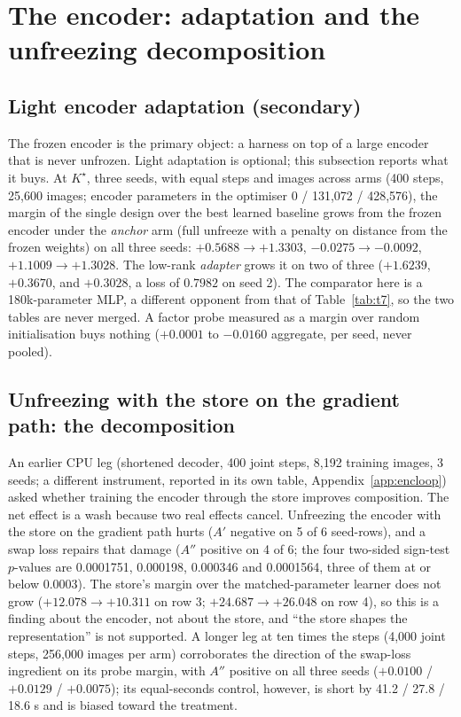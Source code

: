 \documentclass{article} %
\newcommand{\Kstar}{\ensuremath{K^{\star}}}
\begin{document}
\section{The encoder: adaptation and the unfreezing decomposition}
\label{app:encoder-main}

\subsection*{Light encoder adaptation (secondary)}

The frozen encoder is the primary object: a harness on top of a large encoder that is never
unfrozen. Light adaptation is optional; this subsection reports what it buys. At $\Kstar$, three
seeds, with equal steps and images across arms (400 steps, 25,600 images; encoder parameters in the
optimiser 0 / 131,072 / 428,576), the margin of the single design over the best learned
baseline grows from the frozen encoder under the \emph{anchor} arm (full unfreeze with a
penalty on distance from the frozen weights) on all three seeds: $+0.5688\to+1.3303$,
$-0.0275\to-0.0092$, $+1.1009\to+1.3028$. The low-rank \emph{adapter} grows it on two of
three ($+1.6239$, $+0.3670$, and $+0.3028$, a loss of $0.7982$ on seed 2).
The comparator here is a 180k-parameter MLP, a different opponent from that of
Table~\ref{tab:t7}, so the two tables are never merged. A factor probe measured as a margin over
random initialisation buys nothing ($+0.0001$ to $-0.0160$ aggregate, per seed, never pooled).

\subsection*{Unfreezing with the store on the gradient path: the decomposition}

An earlier CPU leg (shortened decoder, 400 joint steps, 8,192 training images, 3 seeds; a
different instrument, reported in its own table, Appendix~\ref{app:encloop}) asked whether
training the encoder through the store improves composition. The net effect is a wash because two
real effects cancel. Unfreezing the encoder with the store on the gradient path hurts ($A'$
negative on 5 of 6 seed-rows), and a swap loss repairs that damage ($A''$ positive on 4 of 6;
the four two-sided sign-test $p$-values are 0.0001751, 0.000198, 0.000346 and 0.0001564, three
of them at or below 0.0003). The store's margin over
the matched-parameter learner does not grow ($+12.078\to+10.311$ on row 3; $+24.687\to+26.048$
on row 4), so this is a finding about the encoder, not about the store, and ``the store shapes
the representation'' is not supported. %
A longer leg at ten times the steps (4,000 joint steps, 256,000 images per arm) corroborates
the direction of the swap-loss ingredient on its probe margin, with $A''$ positive on all three
seeds ($+0.0100$ / $+0.0129$ / $+0.0075$); its equal-seconds control, however, is short by 41.2 /
27.8 / 18.6 s and is biased toward the treatment. %
\end{document}
